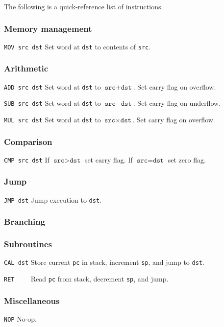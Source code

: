 \documentclass[a5paper,onecolumn,final,10pt]{memoir}
\begin{document}
The following is a quick-reference list of instructions.

\subsubsection*{Memory management}

\noindent\texttt{MOV src dst} \quad Set word at \texttt{dst} to contents of \texttt{src}.

\subsubsection*{Arithmetic}

\noindent\texttt{ADD src dst} \quad Set word at \texttt{dst} to $\texttt{src}+\texttt{dst}$. Set carry flag on overflow.

\noindent\texttt{SUB src dst} \quad Set word at \texttt{dst} to $\texttt{src}-\texttt{dst}$. Set carry flag on underflow.

\noindent\texttt{MUL src dst} \quad Set word at \texttt{dst} to $\texttt{src}×\texttt{dst}$. Set carry flag on overflow.

\subsubsection*{Comparison}

\noindent\texttt{CMP src dst} \quad If $\texttt{src}>\texttt{dst}$ set carry flag. If $\texttt{src}=\texttt{dst}$ set zero flag.

\subsubsection*{Jump}

\noindent\texttt{JMP dst} \quad Jump execution to \texttt{dst}.

\subsubsection*{Branching}

\subsubsection*{Subroutines}

\noindent\texttt{CAL dst} \quad Store current \texttt{pc} in stack, increment \texttt{sp}, and jump to \texttt{dst}.

\noindent\texttt{RET~~~~} \quad Read \texttt{pc} from stack, decrement \texttt{sp}, and jump.

\subsubsection*{Miscellaneous}

\noindent\texttt{NOP} \quad No-op.
\end{document}

